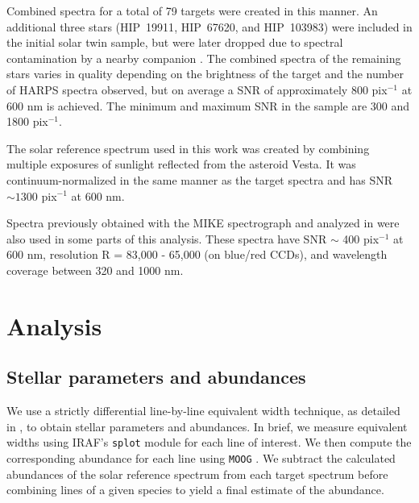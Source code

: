 \documentclass[twocolumn]{aastex62}
\newcommand{\acronym}[1]{{\small{#1}}}
\newcommand{\hip}[1]{{\acronym{HIP}\ #1}}
\begin{document}
Combined spectra for a total of 79 targets were created in this manner. 
An additional three stars (\hip{19911}, \hip{67620}, and \hip{103983}) were included in the initial solar twin sample, but were later dropped due to spectral contamination by a nearby companion \citep{dosSantos17}. 
The combined spectra of the remaining stars varies in quality depending on the brightness of the target and the number of \acronym{HARPS} spectra observed, but on average a \acronym{SNR} of approximately 800 pix$^{-1}$ at 600 nm is achieved. The minimum and maximum \acronym{SNR} in the sample are 300 and 1800 pix$^{-1}$.

The solar reference spectrum used in this work was created by combining multiple exposures of sunlight reflected from the asteroid Vesta. It was continuum-normalized in the same manner as the target spectra and has \acronym{SNR} $\sim 1300$ pix$^{-1}$ at 600 nm.

Spectra previously obtained with the \acronym{MIKE} spectrograph \citep{bernstein03} and analyzed in \citet{ramirez14} were also used in some parts of this analysis. These spectra have \acronym{SNR} $\sim$ 400 pix$^{-1}$ at 600 nm, resolution R = 83,000 - 65,000 (on blue/red CCDs), and wavelength coverage between 320 and 1000 nm.

\section{Analysis}
\subsection{Stellar parameters and abundances}
\label{ss:ews}

We use a strictly differential line-by-line equivalent width technique, as detailed in \citet{bedell14}, to obtain stellar parameters and abundances. In brief, we measure equivalent widths using IRAF's \texttt{splot} module for each line of interest. We then compute the corresponding abundance for each line using \texttt{MOOG} \citep{sneden73}. We subtract the calculated abundances of the solar reference spectrum from each target spectrum before combining lines of a given species to yield a final estimate of the abundance.
\end{document}
